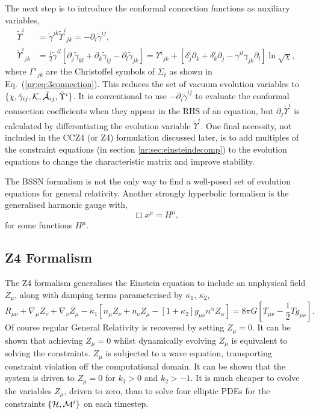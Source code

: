 The next step is to introduce the conformal connection functions as auxiliary variables,
\begin{align}
\tilde{\Upsilon}^i &= \tilde{\gamma}^{jk}\tilde{\Upsilon}^i_{\,\;jk} = -\partial_i \tilde{\gamma}^{ij},\\
 \tilde{\Upsilon}^i_{\,\;jk} &= \frac{1}{2}\tilde{\gamma}^{il}\left[ \partial_j \tilde{\gamma}_{kl} + \partial_k \tilde{\gamma}_{lj} - \partial_l \tilde{\gamma}_{jk}\right] = \Upsilon^i_{\;\,jk} + \left[ \delta^i_j \partial_k + \delta^i_k \partial_j - \gamma^{il}\gamma_{jk}\partial_l\right] \ln \sqrt{\chi},
 \end{align}
where $\Gamma^i_{\,\,\,jk}$ are the Christoffel symbols of $\Sigma_t$ as shown in Eq.~(\ref{nr:eq:3connection}).
This reduces the set of vacuum evolution variables to $\{\chi,\tilde{\gamma}_{ij},\mathcal{K},\tilde{\mathcal{A}}_{ij},\tilde{\Upsilon}^i \}$. It is conventional to use $-\partial_i \tilde{\gamma}^{ij}$ to evaluate the conformal connection coefficients when they appear in the RHS of an equation, but $\partial_j \tilde{\Upsilon}^i$ is calculated by differentiating the evolution variable $\tilde{\Upsilon}^i$. One final necessity, not included in the CCZ4 \color{orchid} (or Z4) \color{black} formulation discussed later, is to add multiples of the constraint equations (in section \ref{nr:sec:einsteindecomp}) to the evolution equations to change the characteristic matrix and improve stability.

The BSSN formalism is not the only way to find a well-posed set of evolution equations for general relativity. Another strongly hyperbolic formalism is the generalised harmonic gauge \cite{Garfinkle:2001ni} \cite{garfinkle2002harmonic} \cite{Pretorius:2004jg} \cite{Pretorius:2005gq} with,
\begin{equation}\Box x^\mu = H^\mu,\end{equation}
for some functions $H^\mu$.


\subsection{Z4 Formalism}
The Z4 formalism \cite{gundlach2005constraint} generalises the Einstein equation to include an unphysical field $Z_\mu$, along with damping terms parameterised by $\kappa_1$, $\kappa_2$,
\begin{equation}\label{nr:eq:z4einstein} R_{\mu\nu} + \nabla_\mu Z_\nu + \nabla_\nu Z_\mu - \kappa_1\left[ n_\mu Z_\nu + n_\nu Z_\mu - [1+\kappa_2]g_{\mu\nu}n^\alpha Z_\alpha\right] = 8\pi G \left[T_{\mu\nu}- \frac{1}{2}Tg_{\mu\nu} \right].\end{equation}
Of course regular General Relativity is recovered by setting $Z_\mu=0$. It can be shown that achieving $Z_\mu=0$ whilst dynamically evolving $Z_\mu$  is equivalent to solving the constraints. $Z_\mu$ is subjected to a wave equation, transporting constraint violation off the computational domain. It can be shown that the system is driven to $Z_\mu =0$ for $k_1>0$ and $k_2>-1$. It is much cheaper to evolve the variables $Z_\mu$, driven to zero, than to solve four elliptic PDEs for the constraints $\{\mathcal{H},\mathcal{M}^i\}$ on each timestep.


